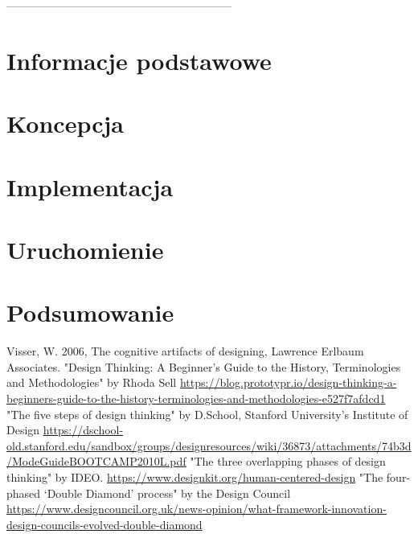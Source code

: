 \documentclass[a4paper,titleauthor]{mwart}
\begin{document}
------------------------------------------------------------
\section{Informacje podstawowe}
\label{sec:informacje_podstawowe}

\section{Koncepcja}
\label{sec:koncepcja}

\section{Implementacja}
\label{sec:implementacja}


\section{Uruchomienie}
\label{sec:uruchomienie}

	
\section{Podsumowanie}
\label{sec:podsumowanie}



\begin{thebibliography}{SYCYfProjekt}
 Visser, W. 2006, The cognitive artifacts of designing, Lawrence Erlbaum Associates.
"Design Thinking: A Beginner’s Guide to the History, Terminologies and Methodologies" by Rhoda Sell \url{https://blog.prototypr.io/design-thinking-a-beginners-guide-to-the-history-terminologies-and-methodologies-e527f7afdcd1}
"The five steps of design thinking" by D.School, Stanford University’s Institute of Design \url{https://dschool-old.stanford.edu/sandbox/groups/designresources/wiki/36873/attachments/74b3d/ModeGuideBOOTCAMP2010L.pdf}
"The three overlapping phases of design thinking" by IDEO. \url{https://www.designkit.org/human-centered-design}
"The four-phased ‘Double Diamond’ process" by the Design Council \url{https://www.designcouncil.org.uk/news-opinion/what-framework-innovation-design-councils-evolved-double-diamond}
\end{thebibliography}
\end{document}
